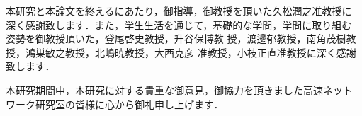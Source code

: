 \documentclass[main]{subfiles}
\begin{document}
\acknowledgment

本研究と本論文を終えるにあたり，御指導，御教授を頂いた久松潤之准教授に
深く感謝致します．また，学生生活を通じて，基礎的な学問，学問に取り組む
姿勢を御教授頂いた，登尾啓史教授，升谷保博教
授，渡邊郁教授，南角茂樹教授，鴻巣敏之教授，北嶋暁教授，大西克彦
准教授，小枝正直准教授に深く感謝致します．

本研究期間中，本研究に対する貴重な御意見，御協力を頂きました高速ネット
ワーク研究室の皆様に心から御礼申し上げます．
\end{document}
